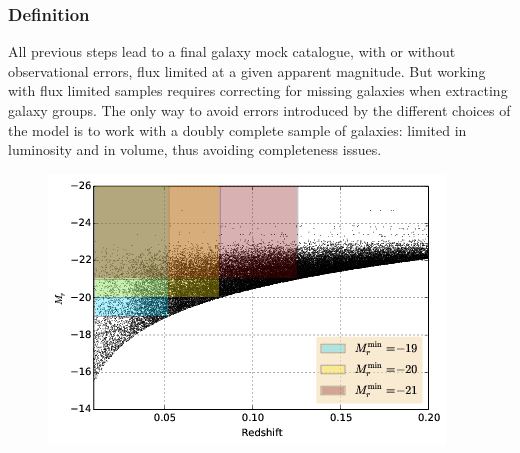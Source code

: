 \subsubsection{Definition}
\label{ssub:galaxy_sample_definition}

All previous steps lead to a final galaxy mock catalogue, with or without
observational errors, flux limited at a given apparent magnitude. But working
with flux limited samples requires correcting for missing galaxies when
extracting galaxy groups. The only way to avoid errors introduced by the
different choices of the model is to work with a doubly complete sample of
galaxies: limited in luminosity and in volume, thus avoiding completeness
issues.
%
\begin{figure}[htb]
    \centering
    \begin{minipage}{0.49\linewidth}
        \includegraphics[width=\linewidth]{figures/mock/subsamples.png}
    \end{minipage}
    \begin{minipage}{0.49\linewidth}

\end{minipage}
\end{figure}
